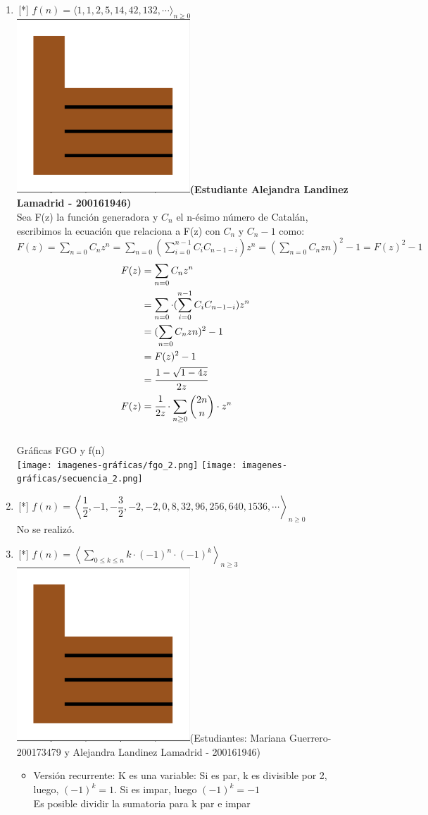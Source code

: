 \begin{enumerate}
       \item\,[*] $f(n)=\langle 1, 1, 2, 5, 14, 42, 132, \cdots\rangle_{n\ge 0}$%
       \\
       \includegraphics[width= 10 mm]{figures/exc.png}\textbf{(Estudiante Alejandra Landinez Lamadrid - 200161946)}
       \\
        Sea F(z) la función generadora y $C_n$ el n-ésimo número de Catalán, escribimos la ecuación que relaciona a F(z) con $C_n$ y $C_n-1$ como:\\
        $F(z) = \sum_{n=0} C_n z^n = \sum_{n=0}(\displaystyle\sum_{i=0}^{n-1} C_i C_{n-1-i}) z^n = (\sum_{n=0} C_n zn)^2 - 1 = F(z)^2-1$\\
        \begin{align*}
            F(z) &= \sum_{n=0} C_n z^n\\
            &= \sum_{n=0}\cdot(\displaystyle\sum_{i=0}^{n-1} C_i C_{n-1-i}) z^n\\
            &= (\sum_{n=0} C_n zn)^2 - 1\\
            &= F(z)^2-1\\
            &= \cfrac{1-\sqrt{1-4z}}{2z}\\
            F(z) &= \cfrac{1}{2z}\cdot\sum_{n\geq0} \binom{2n}{n}\cdot z^n
        \end{align*}
        \\Gráficas FGO y f(n)\\
    \texttt{[image: imagenes-gráficas/fgo\_2.png]}
    \texttt{[image: imagenes-gráficas/secuencia\_2.png]}
         
    \item\,[*] $f(n)=\left\langle\dfrac{1}{2}, -1,-\dfrac{3}{2},-2,-2, 0,8,32,96,256,640,1536,\cdots\right\rangle_{n\ge 0}$\\
        No se realizó.
    \item\,[*]  $f(n)=\left\langle \sum_{0\leq k\leq n}{k\cdot (-1)^n\cdot (-1)^k}\right\rangle_{n\geq3}$ \\
    \includegraphics[width= 10 mm]{figures/exc.png}(Estudiantes: Mariana Guerrero- 200173479 y Alejandra Landinez Lamadrid - 200161946)
    \cite{ChatGPT_sec}
    \begin{itemize}
        \item Versión recurrente: K es una variable: Si es par, k es divisible por 2, luego,  $(-1)^k = 1$. Si es impar, luego $(-1)^k =-1$ \\
            Es posible dividir la sumatoria para k par e impar\\
            

\end{itemize}
\end{enumerate}
